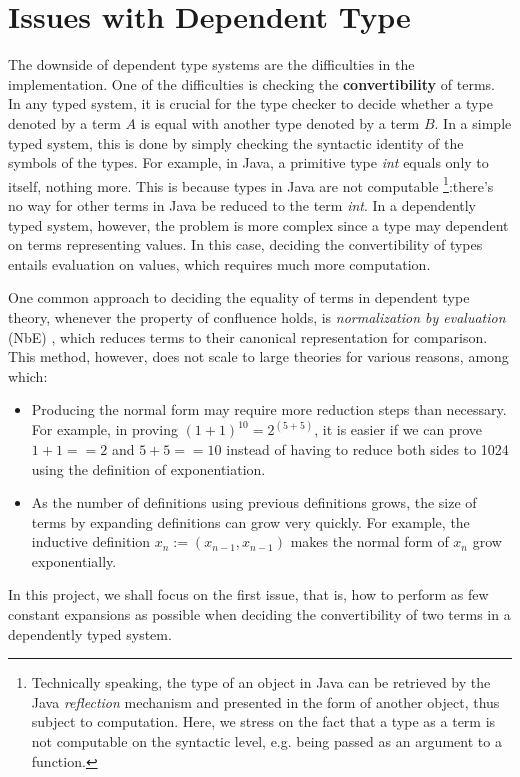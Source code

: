 \section{Issues with Dependent Type}
The downside of dependent type systems are the difficulties in the implementation. One of the difficulties is checking the \textbf{convertibility} of terms. In any typed system, it is crucial for the type checker to decide whether a type denoted by a term $A$ is equal with another type denoted by a term $B$. In a simple typed system, this is done by simply checking the syntactic identity of the symbols of the types. For example, in Java, a primitive type \emph{int} equals only to itself, nothing more. This is because types in Java are not computable \footnote{Technically speaking, the type of an object in Java can be retrieved by the Java \emph{reflection} mechanism and presented in the form of another object, thus subject to computation. Here, we stress on the fact that a type as a term is not computable on the syntactic level, e.g. being passed as an argument to a function.}:there's no way for other terms in Java be reduced to the term \emph{int}. In a dependently typed system, however, the problem is more complex since a type may dependent on terms representing values. In this case, deciding the convertibility of types entails evaluation on values, which requires much more computation.

One common approach to deciding the equality of terms in dependent type theory, whenever the property of confluence holds, is \textit{normalization by evaluation} (NbE) \cite{berger1998normalization}, which reduces terms to their canonical representation for comparison. This method, however, does not scale to large theories for various reasons, among which:
\begin{itemize}
\item Producing the normal form may require more reduction steps than necessary. For example, in proving $(1 + 1) ^ {10} = 2 ^{(5 + 5)}$, it is easier if we can prove $1 + 1 == 2$ and $5 + 5 == 10$ instead of having to reduce both sides to 1024 using the definition of exponentiation.
\item As the number of definitions using previous definitions grows, the size of terms by expanding definitions can grow very quickly. For example, the inductive definition $x_n := (x_{n-1}, x_{n-1})$ makes the normal form of $x_{n}$ grow exponentially.
\end{itemize}

In this project, we shall focus on the first issue, that is, how to perform as few constant expansions as possible when deciding the convertibility of two terms in a dependently typed system. 

